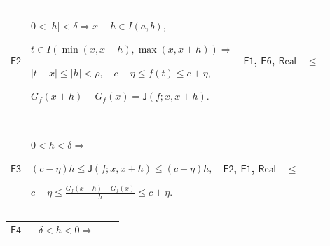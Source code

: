 \documentclass[11pt]{amsart}
\newlength{\FTCFourColumnBody}
\begin{document}
{\par\setlength{\parskip}{0pt}\nointerlineskip
\noindent
\begin{tabular}{|@{}>{\centering\arraybackslash}m{0.078431\FTCFourColumnBody}|>{\centering\arraybackslash}m{0.535947\FTCFourColumnBody}|>{\centering\arraybackslash}m{0.281045\FTCFourColumnBody}|>{\centering\arraybackslash}m{0.104575\FTCFourColumnBody}|}\hline
\hypertarget{proof:F2}{$\displaystyle \textsf{F2}$} & $\displaystyle 0<|h|<\delta\Rightarrow x+h\in I(a,b),$\par
$\displaystyle t\in I(\min(x,x+h),\max(x,x+h))\Rightarrow$\par
$\displaystyle |t-x|\le|h|<\rho,\quad c-\eta\le f(t)\le c+\eta,$\par
$\displaystyle G_f(x+h)-G_f(x)=\textsf{J}(f;x,x+h).$ & \hyperlink{proof:F1}{$\displaystyle \textsf{F1}$}, \hyperlink{proof:E6}{$\displaystyle \textsf{E6}$}, \hyperlink{ax:Real}{$\displaystyle \textsf{Real}$} & $\displaystyle \le$\\ \hline
\end{tabular}%
\par\setlength{\parskip}{0pt}\nointerlineskip
\noindent
\begin{tabular}{|@{}>{\centering\arraybackslash}m{0.078431\FTCFourColumnBody}|>{\centering\arraybackslash}m{0.535947\FTCFourColumnBody}|>{\centering\arraybackslash}m{0.281045\FTCFourColumnBody}|>{\centering\arraybackslash}m{0.104575\FTCFourColumnBody}|}\hline
\hypertarget{proof:F3}{$\displaystyle \textsf{F3}$} & $\displaystyle 0<h<\delta\Rightarrow$\par
$\displaystyle (c-\eta)h\le\textsf{J}(f;x,x+h)\le(c+\eta)h,$\par
$\displaystyle c-\eta\le\frac{G_f(x+h)-G_f(x)}h\le c+\eta.$ & \hyperlink{proof:F2}{$\displaystyle \textsf{F2}$}, \hyperlink{proof:E1}{$\displaystyle \textsf{E1}$}, \hyperlink{ax:Real}{$\displaystyle \textsf{Real}$} & $\displaystyle \le$\\ \hline
\end{tabular}%
\par\setlength{\parskip}{0pt}\nointerlineskip
\noindent
\begin{tabular}{|@{}>{\centering\arraybackslash}m{0.078431\FTCFourColumnBody}|>{\centering\arraybackslash}m{0.535947\FTCFourColumnBody}|>{\centering\arraybackslash}m{0.281045\FTCFourColumnBody}|>{\centering\arraybackslash}m{0.104575\FTCFourColumnBody}|}\hline
\hypertarget{proof:F4}{$\displaystyle \textsf{F4}$} & $\displaystyle -\delta<h<0\Rightarrow$\par

\end{tabular}}
\end{document}
